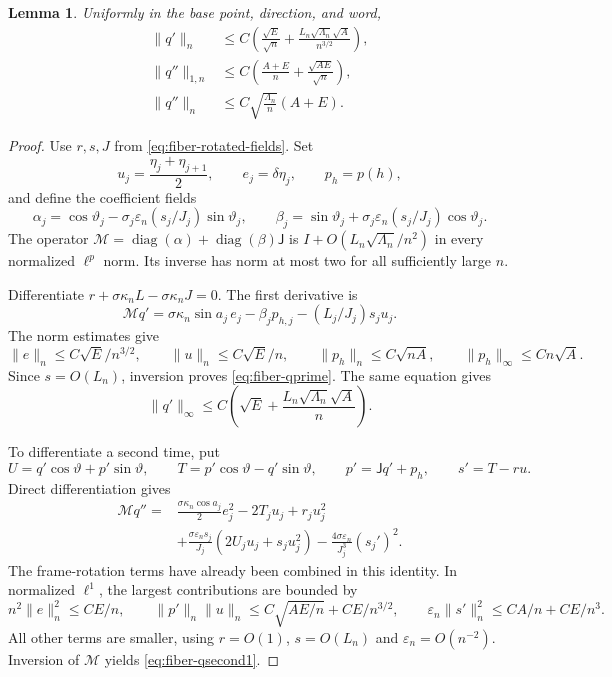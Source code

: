 \documentclass[11pt,reqno]{amsart}
\numberwithin{equation}{section}
\newtheorem{lemma}[theorem]{Lemma}
\theoremstyle{definition}
\theoremstyle{remark}
\newcommand{\norm}[1]{\lVert #1\rVert}
\newcommand{\dd}{\delta}
\begin{document}
\begin{lemma}\label{lem:normal-derivatives}
Uniformly in the base point, direction, and word,
\begin{align}
 \norm{q'}_n&\le C\left(\frac{\sqrt E}{\sqrt n}
        +\frac{L_n\sqrt{\Lambda_n}\sqrt A}{n^{3/2}}\right),
         \label{eq:fiber-qprime}\\
 \norm{q''}_{1,n}&\le C\left(\frac{A+E}{n}
                               +\frac{\sqrt{AE}}{\sqrt n}\right),
         \label{eq:fiber-qsecond1}\\
 \norm{q''}_n&\le C\sqrt{\frac{\Lambda_n}{n}}(A+E).
         \label{eq:fiber-qsecond2}
\end{align}
\end{lemma}
\begin{proof}
Use $r,s,J$ from \eqref{eq:fiber-rotated-fields}. Set
\[
 u_j=\frac{\eta_j+\eta_{j+1}}2,\qquad e_j=\dd\eta_j,\qquad p_h=p(h),
\]
and define the coefficient fields
\[
 \alpha_j=\cos\vartheta_j-\sigma_j\varepsilon_n(s_j/J_j)\sin\vartheta_j,
 \qquad
 \beta_j=\sin\vartheta_j+\sigma_j\varepsilon_n(s_j/J_j)\cos\vartheta_j.
\]
The operator
$\mathcal M=\operatorname{diag}(\alpha)+\operatorname{diag}(\beta)\mathsf J$
is $I+O(L_n\sqrt{\Lambda_n}/n^2)$ in every normalized $\ell^p$ norm. Its inverse has norm at most two for all sufficiently large $n$.

Differentiate $r+\sigma\kappa_nL-\sigma\kappa_nJ=0$. The first derivative is
\begin{equation}\label{eq:fiber-qprime-exact}
 \mathcal Mq'=\sigma\kappa_n\sin a_j\,e_j
              -\beta_jp_{h,j}-(L_j/J_j)s_ju_j.
\end{equation}
The norm estimates give
\[
 \norm e_n\le C\sqrt E/n^{3/2},\qquad
 \norm u_n\le C\sqrt E/n,\qquad
 \norm{p_h}_n\le C\sqrt{nA},\qquad
 \norm{p_h}_\infty\le Cn\sqrt A.
\]
Since $s=O(L_n)$, inversion proves \eqref{eq:fiber-qprime}. The same equation gives
\[
 \norm{q'}_\infty
 \le C\left(\sqrt E+\frac{L_n\sqrt{\Lambda_n}\sqrt A}{n}\right).
\]

To differentiate a second time, put
\[
 U=q'\cos\vartheta+p'\sin\vartheta,\qquad
 T=p'\cos\vartheta-q'\sin\vartheta,\qquad
 p'=\mathsf Jq'+p_h,\qquad s'=T-ru.
\]
Direct differentiation gives
\begin{equation}\label{eq:fiber-qsecond-exact}
 \begin{split}
 \mathcal Mq''={}&\frac{\sigma\kappa_n\cos a_j}{2}e_j^2
                  -2T_ju_j+r_ju_j^2\\
 &+\frac{\sigma\varepsilon_ns_j}{J_j}(2U_ju_j+s_ju_j^2)
                  -\frac{4\sigma\varepsilon_n}{J_j^3}(s_j')^2.
 \end{split}
\end{equation}
The frame-rotation terms have already been combined in this identity. In normalized $\ell^1$, the largest contributions are bounded by
\[
 n^2\norm e_n^2\le CE/n,\qquad
 \norm{p'}_n\norm u_n\le C\sqrt{AE/n}+CE/n^{3/2},\qquad
 \varepsilon_n\norm{s'}_n^2\le CA/n+CE/n^3.
\]
All other terms are smaller, using $r=O(1)$, $s=O(L_n)$ and $\varepsilon_n=O(n^{-2})$. Inversion of $\mathcal M$ yields \eqref{eq:fiber-qsecond1}.


\end{proof}
\end{document}
